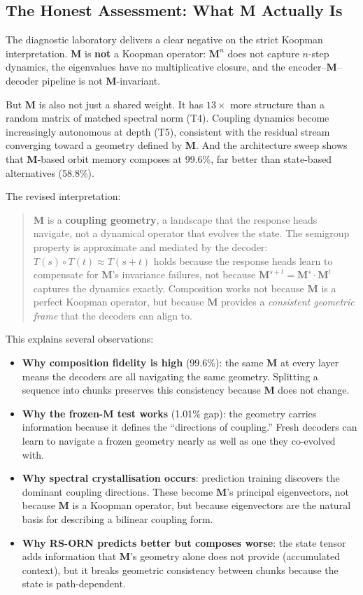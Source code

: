 \documentclass[11pt, a4paper]{article}
\newcommand{\M}{\mathbf{M}}
\theoremstyle{plain}
\theoremstyle{remark}
\begin{document}
\subsection{The Honest Assessment: What M Actually Is}

The diagnostic laboratory delivers a clear negative on the strict Koopman interpretation.
$\M$ is \textbf{not} a Koopman operator: $\M^n$ does not capture $n$-step dynamics, the eigenvalues have no multiplicative closure, and the encoder--$\M$--decoder pipeline is not $\M$-invariant.

But $\M$ is also not just a shared weight.
It has $13\times$ more structure than a random matrix of matched spectral norm (T4).
Coupling dynamics become increasingly autonomous at depth (T5), consistent with the residual stream converging toward a geometry defined by $\M$.
And the architecture sweep shows that $\M$-based orbit memory composes at 99.6\%, far better than state-based alternatives (58.8\%).

The revised interpretation:

\begin{quote}
$\M$ is a \textbf{coupling geometry}, a landscape that the response heads navigate, not a dynamical operator that evolves the state.
The semigroup property is approximate and mediated by the decoder: $T(s) \circ T(t) \approx T(s{+}t)$ holds because the response heads learn to compensate for $\M$'s invariance failures, not because $\M^{s+t} = \M^s \cdot \M^t$ captures the dynamics exactly.
Composition works not because $\M$ is a perfect Koopman operator, but because $\M$ provides a \emph{consistent geometric frame} that the decoders can align to.
\end{quote}

This explains several observations:
\begin{itemize}[nosep]
    \item \textbf{Why composition fidelity is high} (99.6\%): the same $\M$ at every layer means the decoders are all navigating the same geometry.
    Splitting a sequence into chunks preserves this consistency because $\M$ does not change.
    \item \textbf{Why the frozen-$\M$ test works} (1.01\% gap): the geometry carries information because it defines the ``directions of coupling.''
    Fresh decoders can learn to navigate a frozen geometry nearly as well as one they co-evolved with.
    \item \textbf{Why spectral crystallisation occurs}: prediction training discovers the dominant coupling directions.
    These become $\M$'s principal eigenvectors, not because $\M$ is a Koopman operator, but because eigenvectors are the natural basis for describing a bilinear coupling form.
    \item \textbf{Why RS-ORN predicts better but composes worse}: the state tensor adds information that $\M$'s geometry alone does not provide (accumulated context), but it breaks geometric consistency between chunks because the state is path-dependent.
\end{itemize}
\end{document}
